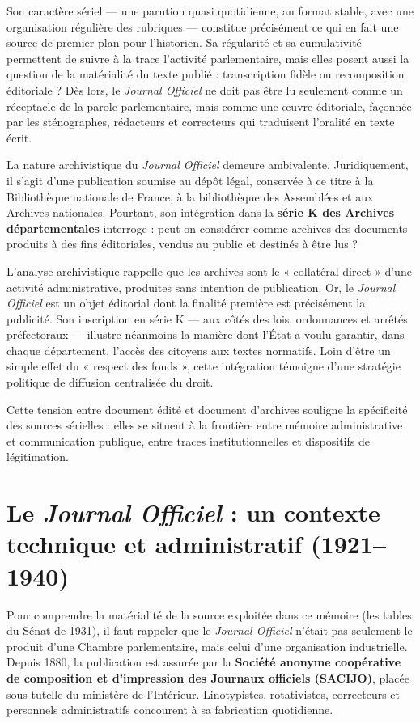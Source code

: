 Son caractère sériel — une parution quasi quotidienne, au format stable, avec une organisation régulière des rubriques — constitue précisément ce qui en fait une source de premier plan pour l’historien. Sa régularité et sa cumulativité permettent de suivre à la trace l’activité parlementaire, mais elles posent aussi la question de la matérialité du texte publié : transcription fidèle ou recomposition éditoriale ? Dès lors, le \emph{Journal Officiel} ne doit pas être lu seulement comme un réceptacle de la parole parlementaire, mais comme une œuvre éditoriale, façonnée par les sténographes, rédacteurs et correcteurs qui traduisent l’oralité en texte écrit.

La nature archivistique du \emph{Journal Officiel} demeure ambivalente. Juridiquement, il s’agit d’une publication soumise au dépôt légal, conservée à ce titre à la Bibliothèque nationale de France, à la bibliothèque des Assemblées et aux Archives nationales. Pourtant, son intégration dans la \textbf{série K des Archives départementales} interroge : peut-on considérer comme archives des documents produits à des fins éditoriales, vendus au public et destinés à être lus ?

L’analyse archivistique rappelle que les archives sont le « collatéral direct » d’une activité administrative, produites sans intention de publication. Or, le \emph{Journal Officiel} est un objet éditorial dont la finalité première est précisément la publicité. Son inscription en série K — aux côtés des lois, ordonnances et arrêtés préfectoraux — illustre néanmoins la manière dont l’État a voulu garantir, dans chaque département, l’accès des citoyens aux textes normatifs. Loin d’être un simple effet du « respect des fonds », cette intégration témoigne d’une stratégie politique de diffusion centralisée du droit.

Cette tension entre document édité et document d’archives souligne la spécificité des sources sérielles : elles se situent à la frontière entre mémoire administrative et communication publique, entre traces institutionnelles et dispositifs de légitimation.

\section{Le \emph{Journal Officiel} : un contexte technique et administratif (1921–1940)}

Pour comprendre la matérialité de la source exploitée dans ce mémoire (les tables du Sénat de 1931), il faut rappeler que le \emph{Journal Officiel} n’était pas seulement le produit d’une Chambre parlementaire, mais celui d’une organisation industrielle. Depuis 1880, la publication est assurée par la \textbf{Société anonyme coopérative de composition et d’impression des Journaux officiels (SACIJO)}, placée sous tutelle du ministère de l’Intérieur. Linotypistes, rotativistes, correcteurs et personnels administratifs concourent à sa fabrication quotidienne.

